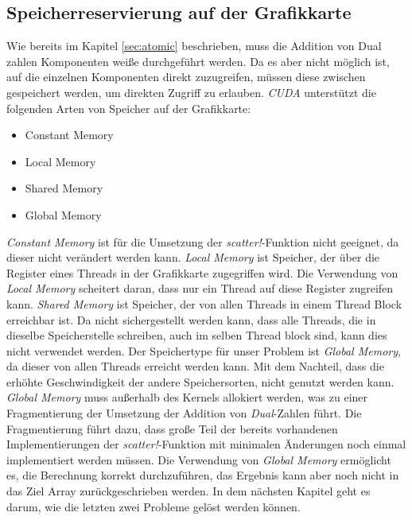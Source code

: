 \subsection{Speicherreservierung auf der Grafikkarte} \label{sec:memory}

Wie bereits im Kapitel \ref{sec:atomic} beschrieben, 
muss die Addition von Dual zahlen Komponenten weiße durchgeführt werden.
Da es aber nicht möglich ist, auf die einzelnen Komponenten direkt zuzugreifen,
müssen diese zwischen gespeichert werden, um direkten Zugriff zu erlauben.
\textit{CUDA} \cite{besard2018juliagpu} unterstützt die folgenden Arten von Speicher auf der Grafikkarte:

\begin{itemize}
	\item Constant Memory
	\item Local Memory
	\item Shared Memory
	\item Global Memory
\end{itemize}

\textit{Constant Memory} ist für die Umsetzung der \textit{scatter!}-Funktion nicht geeignet,
da dieser nicht verändert werden kann.
\textit{Local Memory} ist Speicher, 
der über die Register eines Threads in der Grafikkarte zugegriffen wird.
Die Verwendung von \textit{Local Memory} scheitert daran, 
dass nur ein Thread auf diese Register zugreifen kann.
\textit{Shared Memory} ist Speicher, 
der von allen Threads in einem Thread Block erreichbar ist.
Da nicht sichergestellt werden kann, dass alle Threads, 
die in dieselbe Speicherstelle schreiben, auch im selben Thread block sind,
kann dies nicht verwendet werden.
Der Speichertype für unser Problem ist \textit{Global Memory}, 
da dieser von allen Threads erreicht werden kann.
Mit dem Nachteil, dass die erhöhte Geschwindigkeit der andere Speichersorten, 
nicht genutzt werden kann.
\textit{Global Memory} muss außerhalb des Kernels allokiert werden, 
was zu einer Fragmentierung der Umsetzung der Addition von \textit{Dual}-Zahlen führt.
Die Fragmentierung führt dazu, 
dass große Teil der bereits vorhandenen Implementierungen der \textit{scatter!}-Funktion mit minimalen Änderungen noch einmal
implementiert werden müssen.
Die Verwendung von \textit{Global Memory} ermöglicht es, die Berechnung korrekt durchzuführen,
das Ergebnis kann aber noch nicht in das Ziel Array zurückgeschrieben werden.
In dem nächsten Kapitel geht es darum, wie die letzten zwei Probleme gelöst werden können.
